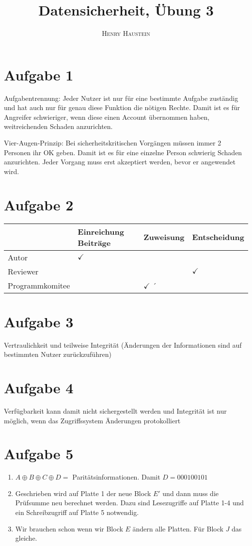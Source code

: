 \documentclass{article}
\title{\textbf{Datensicherheit, Übung 3}}
\author{\textsc{Henry Haustein}}
\date{}
\begin{document}
	\maketitle
	
	\section*{Aufgabe 1}
	Aufgabentrennung: Jeder Nutzer ist nur für eine bestimmte Aufgabe zuständig und hat auch nur für genau diese Funktion die nötigen Rechte. Damit ist es für Angreifer schwieriger, wenn diese einen Account übernommen haben, weitreichenden Schaden anzurichten.
	
	Vier-Augen-Prinzip: Bei sicherheitskritischen Vorgängen müssen immer 2 Personen ihr OK geben. Damit ist es für eine einzelne Person schwierig Schaden anzurichten. Jeder Vorgang muss erst akzeptiert werden, bevor er angewendet wird.

	\section*{Aufgabe 2}
	\begin{center}
		\begin{tabular}{l|l|l|l}
			& Einreichung Beiträge & Zuweisung & Entscheidung \\
			\hline
			Autor & $\checkmark$ & & \\
			\hline
			Reviewer & & & $\checkmark$ \\
			\hline
			Programmkomitee & & $\checkmark$ ´&
		\end{tabular}
	\end{center}
	
	\section*{Aufgabe 3}
	Vertraulichkeit und teilweise Integrität (Änderungen der Informationen sind auf bestimmten Nutzer zurückzuführen)
	
	\section*{Aufgabe 4}
	Verfügbarkeit kann damit nicht sichergestellt werden und Integrität ist nur möglich, wenn das Zugriffssystem Änderungen protokolliert
	
	\section*{Aufgabe 5}
	\begin{enumerate}[label=(\alph*)]
		\item $A\oplus B\oplus C\oplus D = $ Paritätsinformationen. Damit $D = 000100101$
		\item Geschrieben wird auf Platte 1 der neue Block $E'$ und dann muss die Prüfsumme neu berechnet werden. Dazu sind Lesezugriffe auf Platte 1-4 und ein Schreibzugriff auf Platte 5 notwendig.
		\item Wir brauchen schon wenn wir Block $E$ ändern alle Platten. Für Block $J$ das gleiche.
	\end{enumerate}
	
\end{document}
